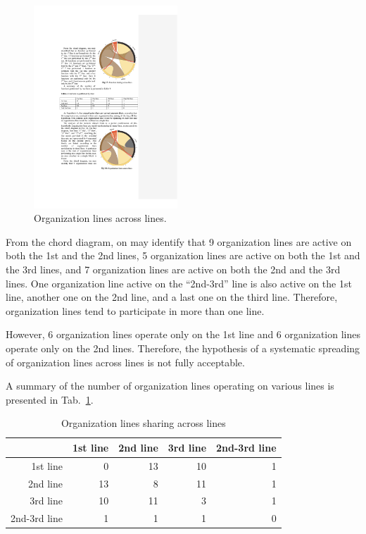 \documentclass[lnbip]{svmultln}
\begin{document}
\begin{figure}
	\vspace{-25pt}
  \begin{center}
    \includegraphics[width=0.48\textwidth]{"figs/pic 16"}
  \end{center}
	\vspace{-10pt}
  \caption{Organization lines across lines.}
  \label{fig:orgsLines:chord}
	\vspace{-10pt}
\end{figure}

From the chord diagram, on may identify that 9 organization lines are active on both the 1st and the 2nd lines, 5 organization lines are active on both the 1st and the 3rd lines, and 7 organization lines are active on both the 2nd and the 3rd lines. One organization line active on the ``2nd-3rd'' line is also active on the 1st line, another one on the 2nd line, and a last one on the third line. Therefore, organization lines tend to participate in more than one line. 

However, 6 organization lines operate only on the 1st line and 6 organization lines operate only on the 2nd lines. Therefore, the hypothesis of a systematic spreading of organization lines across lines is not fully acceptable.

A summary of the number of organization lines operating on various lines is presented in Tab.~\ref{tab:orgsBySTs}.

\begin{table}
\caption{Organization lines sharing across lines}
\label{tab:orgsBySTs}
\begin{center}
\begin{tabular}{rrrrr}
& 1st line & 2nd line & 3rd line & 2nd-3rd line \\[2pt]
\hline\rule{0pt}{12pt}
1st line	   &  0 & 13 & 10 & 1\\
2nd line     & 13 &  8 & 11 & 1\\
3rd line     & 10 & 11 &  3 & 1\\
2nd-3rd line &  1 &  1 &  1 & 0\\[2pt]
\hline
\end{tabular}
\end{center}
\end{table}
\end{document}
